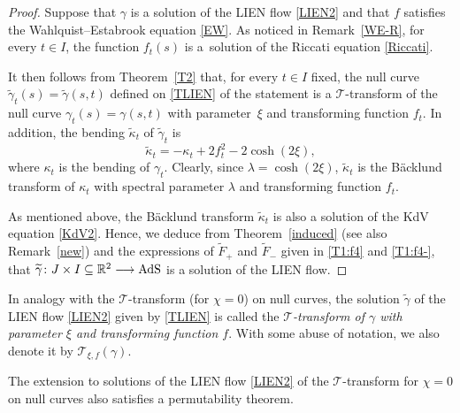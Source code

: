 \documentclass[pdftex]{sigma}
\numberwithin{equation}{section}
\def\bending{\kappa}
\def\R{\mathbb{R}}
\def\AdS{{\rm AdS}}
\begin{document}
\begin{proof} Suppose that $\gamma$ is a solution of the LIEN flow \eqref{LIEN2} and that $f$ satisfies the Wahlquist--Estabrook equation \eqref{EW}. As noticed in Remark~\ref{WE-R}, for every $t\in I$, the function $f_t(s)$ is a~solution of the Riccati equation \eqref{Riccati}.
	
	It then follows from Theorem~\ref{T2} that, for every $t\in I$ fixed, the null curve $\widetilde{\gamma}_t(s)=\widetilde{\gamma}(s,t)$ defined on \eqref{TLIEN} of the statement is a $\mathcal{T}$-transform of the null curve $\gamma_t(s)=\gamma(s,t)$ with parameter~$\xi$ and transforming function $f_t$. In addition, the bending $\widetilde{\bending}_t$ of $\widetilde{\gamma}_t$ is
	\begin{equation*}\widetilde{\bending}_t=-\bending_t+2f_t^2-2\cosh(2\xi),\end{equation*}
	where $\bending_t$ is the bending of $\gamma_t$. Clearly, since $\lambda=\cosh(2\xi)$, $\widetilde{\bending}_t$ is the B\"{a}cklund transform of $\bending_t$ with spectral parameter $\lambda$ and transforming function $f_t$.
	
	As mentioned above, the B\"{a}cklund transform $\widetilde{\bending}_t$ is also a solution of the KdV equation \eqref{KdV2}. Hence, we deduce from Theorem~\ref{induced} (see also Remark~\ref{new}) and the expressions of $\widetilde{F}_+$ and $\widetilde{F}_-$ given in \eqref{T1:f4} and \eqref{T1:f4-}, that $\widetilde{\gamma}\colon J\times I\subseteq\R^2\longrightarrow\AdS$ is a solution of the LIEN flow.
\end{proof}

\begin{Definition} In analogy with the $\mathcal{T}$-transform (for $\chi=0$) on null curves, the solution $\widetilde{\gamma}$ of the LIEN flow \eqref{LIEN2} given by \eqref{TLIEN} is called the \emph{$\mathcal{T}$-transform of $\gamma$ with parameter $\xi$ and transforming function $f$}. With some abuse of notation, we also denote it by $\mathcal{T}_{\xi,f}(\gamma)$.
\end{Definition}

The extension to solutions of the LIEN flow \eqref{LIEN2} of the $\mathcal{T}$-transform for $\chi=0$ on null curves also satisfies a permutability theorem.
\end{document}

